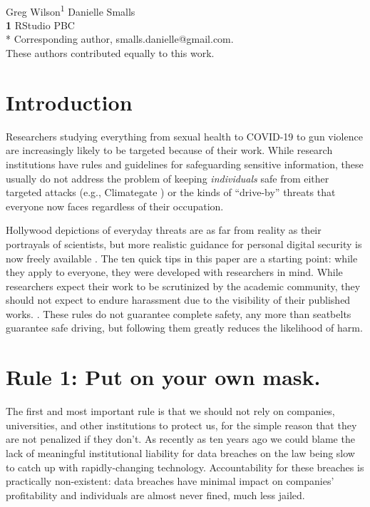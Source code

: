 \documentclass[10pt, letterpaper]{article}
\begin{document}
\vspace*{0.2in}

\begin{flushleft}
{\Large
\textbf{}
}
\newline
\\
{Greg Wilson}\textsuperscript{1{\ddag}}
{Danielle Smalls}\textsuperscript
\\
\bigskip
\textbf{1} RStudio PBC\\
* Corresponding author, smalls.danielle@gmail.com. \\
\bigskip
{\ddag} These authors contributed equally to this work.
\end{flushleft}

\section*{Introduction}

Researchers studying everything from sexual health to COVID-19 to gun violence
are increasingly likely to be targeted because of their work.  While research
institutions have rules and guidelines for safeguarding sensitive information,
these usually do not address the problem of keeping \emph{individuals} safe from
either targeted attacks (e.g., Climategate \cite{Natu2010}) or the kinds of
``drive-by'' threats that everyone now faces regardless of their occupation.

Hollywood depictions of everyday threats are as far from reality as their
portrayals of scientists, but more realistic guidance for personal digital
security is now freely available \cite{FLD,EFJ2015,EFF}. The ten quick tips in
this paper are a starting point: while they apply to everyone, they were
developed with researchers in mind. While researchers expect their work to be
scrutinized by the academic community, they should not expect to endure
harassment due to the visibility of their published works. . These rules do not
guarantee complete safety, any more than seatbelts guarantee safe driving, but
following them greatly reduces the likelihood of harm.

\section*{Rule 1: Put on your own mask.}

The first and most important rule is that we should not rely on companies,
universities, and other institutions to protect us, for the simple reason that
they are not penalized if they don't. As recently as ten years ago we could
blame the lack of meaningful institutional liability for data breaches on the
law being slow to catch up with rapidly-changing technology. Accountability for
these breaches is practically non-existent: data breaches have minimal impact on
companies' profitability and individuals are almost never fined, much less
jailed.
\end{document}
